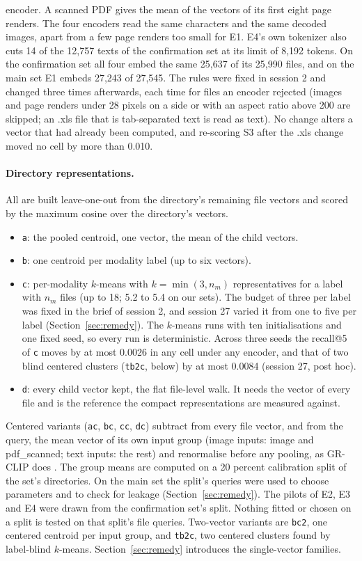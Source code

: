 \documentclass[11pt]{article}
\newcommand{\rep}[1]{\texttt{#1}}
\begin{document}
encoder. A scanned PDF gives the mean of the vectors of its first eight page renders. The four encoders read the same characters and the same decoded images, apart from a few page renders too small for E1. E4's own tokenizer also cuts 14 of the 12,757 texts of the confirmation set at its limit of 8,192 tokens. On the confirmation set all four embed the same 25,637 of its 25,990 files, and on the main set E1 embeds 27,243 of 27,545. The rules were fixed in session 2 and changed three times afterwards, each time for files an encoder rejected (images and page renders under 28 pixels on a side or with an aspect ratio above 200 are skipped; an .xls file that is tab-separated text is read as text). No change alters a vector that had already been computed, and re-scoring S3 after the .xls change moved no cell by more than 0.010.

\paragraph{Directory representations.} All are built leave-one-out from the directory's remaining file vectors and scored by the maximum cosine over the directory's vectors.
\begin{itemize}
\item \rep{a}: the pooled centroid, one vector, the mean of the child vectors.
\item \rep{b}: one centroid per modality label (up to six vectors).
\item \rep{c}: per-modality $k$-means with $k = \min(3, n_m)$ representatives for a label with $n_m$ files (up to 18; 5.2 to 5.4 on our sets). The budget of three per label was fixed in the brief of session 2, and session 27 varied it from one to five per label (Section~\ref{sec:remedy}). The $k$-means runs with ten initialisations and one fixed seed, so every run is deterministic. Across three seeds the recall@5 of \rep{c} moves by at most 0.0026 in any cell under any encoder, and that of two blind centered clusters (\rep{tb2c}, below) by at most 0.0084 (session 27, post hoc).
\item \rep{d}: every child vector kept, the flat file-level walk. It needs the vector of every file and is the reference the compact representations are measured against.
\end{itemize}
Centered variants (\rep{ac}, \rep{bc}, \rep{cc}, \rep{dc}) subtract from every file vector, and from the query, the mean vector of its own input group (image inputs: image and pdf\_scanned; text inputs: the rest) and renormalise before any pooling, as GR-CLIP does \citep{li2025grclip}. The group means are computed on a 20 percent calibration split of the set's directories. On the main set the split's queries were used to choose parameters and to check for leakage (Section~\ref{sec:remedy}). The pilots of E2, E3 and E4 were drawn from the confirmation set's split. Nothing fitted or chosen on a split is tested on that split's file queries. Two-vector variants are \rep{bc2}, one centered centroid per input group, and \rep{tb2c}, two centered clusters found by label-blind $k$-means. Section~\ref{sec:remedy} introduces the single-vector families.
\end{document}
